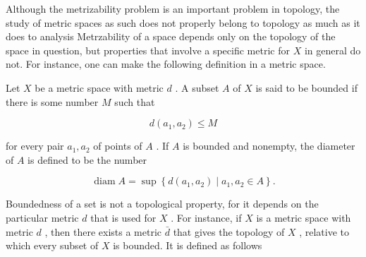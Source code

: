 Although the metrizability problem is an important problem in topology, the study of metric spaces as such does not properly belong to topology as much as it does to analysis Metrzability of a space depends only on the topology of the space in question, but properties that involve a specific metric for \(X\) in general do not. For instance, one can make the following definition in a metric space.

\begin{definition} Let \(X\) be a metric space with metric \(d\) . A subset \(A\) of \(X\) is said to be bounded if there is some number \(M\) such that

\[
d\left( {{a}_{1},{a}_{2}}\right)  \leq  M
\]

for every pair \({a}_{1},{a}_{2}\) of points of \(A\) . If \(A\) is bounded and nonempty, the diameter of \(A\) is defined to be the number

\[
\operatorname{diam}A = \sup \left\{  {d\left( {{a}_{1},{a}_{2}}\right)  \mid  {a}_{1},{a}_{2} \in  A}\right\}  .
\]
\end{definition}

Boundedness of a set is not a topological property, for it depends on the particular metric \(d\) that is used for \(X\) . For instance, if \(X\) is a metric space with metric \(d\) , then there exists a metric \(\bar{d}\) that gives the topology of \(X\) , relative to which every subset of \(X\) is bounded. It is defined as follows

